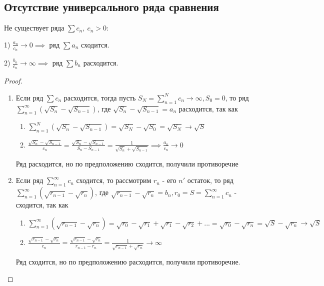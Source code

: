 \subsection{Отсутствие универсального ряда сравнения}
	\begin{proposal}
	Не существует ряда $\sum c_n,\ c_n > 0:$ 
	
	1) $\frac{a_n}{c_n} \to 0 \implies$ ряд $\sum a_n$ сходится.
	
	2) $\frac{b_n}{c_n} \to \infty \implies$ ряд $\sum b_n$ расходится.
\end{proposal}

\begin{proof}~
	
	\begin{enumerate}
		\item Если ряд $\sum c_n$ расходится, тогда пусть $S_N = \sum_{n=1}^{N} c_n \to \infty, S_0=0$, то ряд $\sum_{n=1}^{\infty} (\sqrt{S_n} - \sqrt{S_{n - 1}})$, где $\sqrt{S_n} - \sqrt{S_{n - 1}} = a_n$ расходится, так как
		
		\begin{enumerate}
			\item $\sum_{n=1}^{N} (\sqrt{S_n} - \sqrt{S_{n-1}}) = \sqrt{S_N} - \sqrt{S_0} = \sqrt{S_N} \to \sqrt{S}$
			
			\item $\frac{\sqrt{S_n} - \sqrt{S_{n-1}}}{c_n} = \frac{\sqrt{S_n} - \sqrt{S_{n-1}}}{S_n - S_{n - 1}} = \frac{1}{\sqrt{S_n} + \sqrt{S_{n - 1}}} \implies \frac{a_n}{c_n} \to 0$
		\end{enumerate}
		
		Ряд расходится, но по предположению сходится, получили противоречие
		
		\item Если ряд $\sum_{n=1}^{\infty} c_n$ сходится, то рассмотрим $r_n$ - его $n'$ остаток, то ряд $\sum_{n=1}^{\infty} (\sqrt{r_{n-1}} - \sqrt{r_n})$, где $\sqrt{r_{n-1}} - \sqrt{r_n} = b_n, r_0 = S = \sum_{n = 1}^{\infty} c_n$ - сходится, так как
		
		\begin{enumerate}
			\item $\sum_{n=1}^{\infty} (\sqrt{r_{n-1}} - \sqrt{r_n}) = \sqrt{r_0} - \sqrt{r_1} + \sqrt{r_1} - \sqrt{r_2} + ... = \sqrt{r_0} - \sqrt{r_n} = \sqrt{S} - \sqrt{r_n} \to \sqrt{S}$
			
			\item $\frac{\sqrt{r_{n-1}} - \sqrt{r_n}}{c_n} = \frac{\sqrt{r_{n-1}} - \sqrt{r_n}}{r_{n-1} - r_n} = \frac{1}{\sqrt{r_{n-1}} + \sqrt{r_n}} \to \infty$
		\end{enumerate}
		
		Ряд сходится, но по предположению расходится, получили противоречие.
	\end{enumerate}
\end{proof}